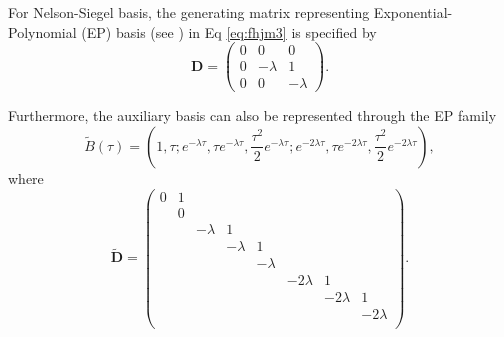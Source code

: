 \documentclass[pdftex,11pt,a4paper] {article}
\begin{document}
For Nelson-Siegel basis, the generating matrix representing Exponential-Polynomial (EP) basis (see \cite{Filipovic2000}) in Eq \eqref{eq:fhjm3} is specified by
\begin{equation}\label{eq:NS_matrix_D_X}
\mathbf{D}=
\begin{pmatrix}
0 & 0 & 0 \\
0 & -\lambda & 1 \\
0 & 0 & -\lambda    
\end{pmatrix}.
\end{equation}



Furthermore, the auxiliary basis can also be represented through the EP family
\begin{equation}\label{eq:NS_basis1}
\tilde B(\tau)=\left(1,\tau; e^{-\lambda\tau}, \tau e^{-\lambda\tau}, \frac{\tau^2}{2} e^{-\lambda\tau}; e^{-2\lambda\tau}, \tau e^{-2\lambda\tau}, \frac{\tau^2}{2} e^{-2\lambda\tau} \right),
\end{equation}
where
\begin{equation}\label{eq:NS_matrix_D_Y}
\tilde{\mathbf{D}}=
\begin{pmatrix}
0  & 1  &          &          &          &           &           &           \\
   & 0  &          &          &          &           &           &           \\
   &    & -\lambda & 1        &          &           &           &           \\
   &    &          & -\lambda & 1        &           &           &           \\
   &    &          &          & -\lambda &           &           &           \\
   &    &          &          &          & -2\lambda & 1         &           \\
   &    &          &          &          &           & -2\lambda & 1         \\
   &    &          &          &          &           &           & -2\lambda \\
\end{pmatrix}.
\end{equation}
\end{document}
